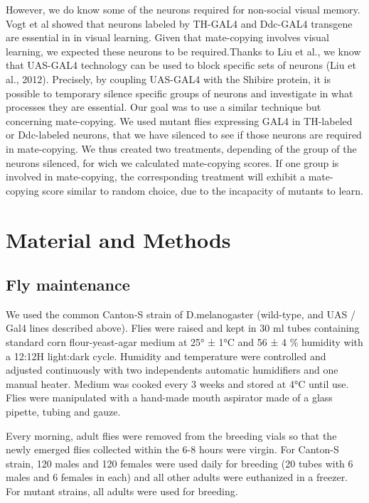\documentclass[a4paper, 12pt]{article}
\begin{document}
	However, we do know some of the neurons required for non-social visual memory. Vogt et al showed that neurons labeled by TH-GAL4 and Ddc-GAL4 transgene are essential in in visual learning. Given that mate-copying involves visual learning, we expected these neurons to be required.Thanks to Liu et al., we know that UAS-GAL4 technology can be used to block specific sets of neurons (Liu et al., 2012). Precisely, by coupling UAS-GAL4 with the Shibire protein, it is possible to temporary silence specific groups of neurons and investigate in what processes they are essential. Our goal was to use a similar technique but concerning mate-copying. We used mutant flies expressing GAL4 in TH-labeled or Ddc-labeled neurons, that we have silenced to see if those neurons are required in mate-copying. We thus created two treatments, depending of the group of the neurons silenced, for wich we calculated mate-copying scores. If one group is involved in mate-copying, the corresponding treatment will exhibit a mate-copying score similar to random choice, due to the incapacity of mutants to learn.
	
	
	\section{Material and Methods}

	\subsection{Fly maintenance}
	
	We used the common Canton-S strain of D.melanogaster (wild-type, and UAS / Gal4 lines described above). Flies were raised and kept in 30 ml tubes containing standard corn flour-yeast-agar medium at 25° ± 1°C and 56 ± 4 \% humidity with a 12:12H light:dark cycle. Humidity and temperature were controlled and adjusted continuously with two independents automatic humidifiers and one manual heater. Medium was cooked every 3 weeks and stored at 4°C until use. Flies were manipulated with a hand-made mouth aspirator made of a glass pipette, tubing and gauze.
	
	Every morning, adult flies were removed from the breeding vials so that the newly emerged flies collected within the 6-8 hours were virgin. For Canton-S strain, 120 males and 120 females were used daily for breeding (20 tubes with 6 males and 6 females in each) and all other adults were euthanized in a freezer. For mutant strains, all adults were used for breeding. 
	
\end{document}

